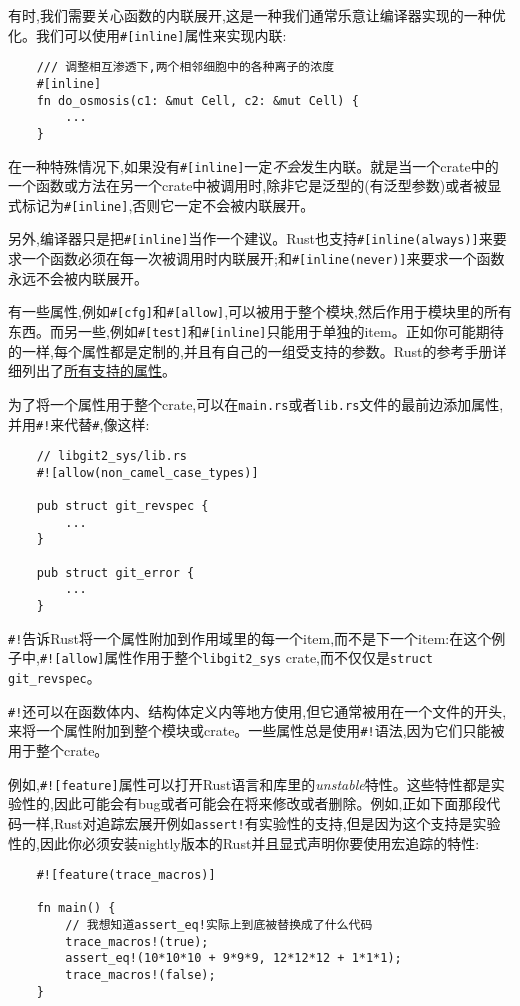 有时,我们需要关心函数的内联展开,这是一种我们通常乐意让编译器实现的一种优化。我们可以使用\texttt{\#[inline]}属性来实现内联:
\begin{verbatim}
    /// 调整相互渗透下,两个相邻细胞中的各种离子的浓度
    #[inline]
    fn do_osmosis(c1: &mut Cell, c2: &mut Cell) {
        ...
    }
\end{verbatim}

在一种特殊情况下,如果没有\texttt{\#[inline]}一定\emph{不会}发生内联。就是当一个crate中的一个函数或方法在另一个crate中被调用时,除非它是泛型的(有泛型参数)或者被显式标记为\texttt{\#[inline]},否则它一定不会被内联展开。

另外,编译器只是把\texttt{\#[inline]}当作一个建议。Rust也支持\texttt{\#[inline(always)]}来要求一个函数必须在每一次被调用时内联展开;和\texttt{\#[inline(never)]}来要求一个函数永远不会被内联展开。

有一些属性,例如\texttt{\#[cfg]}和\texttt{\#[allow]},可以被用于整个模块,然后作用于模块里的所有东西。而另一些,例如\texttt{\#[test]}和\texttt{\#[inline]}只能用于单独的item。正如你可能期待的一样,每个属性都是定制的,并且有自己的一组受支持的参数。Rust的参考手册详细列出了\href{https://doc.rust-lang.org/reference/attributes.html}{所有支持的属性}。

为了将一个属性用于整个crate,可以在\texttt{main.rs}或者\texttt{lib.rs}文件的最前边添加属性,并用\texttt{\#!}来代替\texttt{\#},像这样:
\begin{verbatim}
    // libgit2_sys/lib.rs
    #![allow(non_camel_case_types)]

    pub struct git_revspec {
        ...
    }

    pub struct git_error {
        ...
    }
\end{verbatim}

\texttt{\#!}告诉Rust将一个属性附加到作用域里的每一个item,而不是下一个item:在这个例子中,\texttt{\#![allow]}属性作用于整个\texttt{libgit2\_sys} crate,而不仅仅是\texttt{struct git\_revspec}。

\texttt{\#!}还可以在函数体内、结构体定义内等地方使用,但它通常被用在一个文件的开头,来将一个属性附加到整个模块或crate。一些属性总是使用\texttt{\#!}语法,因为它们只能被用于整个crate。

例如,\texttt{\#![feature]}属性可以打开Rust语言和库里的\emph{unstable}特性。这些特性都是实验性的,因此可能会有bug或者可能会在将来修改或者删除。例如,正如下面那段代码一样,Rust对追踪宏展开例如\texttt{assert!}有实验性的支持,但是因为这个支持是实验性的,因此你必须安装nightly版本的Rust并且显式声明你要使用宏追踪的特性:
\begin{verbatim}
    #![feature(trace_macros)]
    
    fn main() {
        // 我想知道assert_eq!实际上到底被替换成了什么代码
        trace_macros!(true);
        assert_eq!(10*10*10 + 9*9*9, 12*12*12 + 1*1*1);
        trace_macros!(false);
    }
\end{verbatim}

